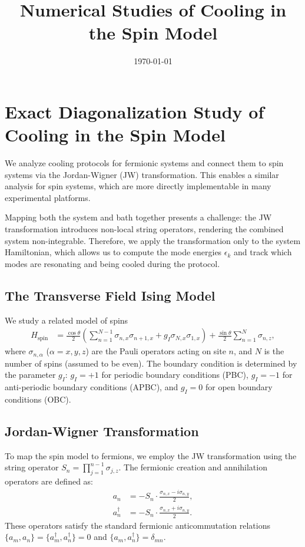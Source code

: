 \documentclass[aps,prx,twocolumn,superscriptaddress,nofootinbib,nolongbibliography,nobalancelastpage,10pt,floatfix]{revtex4-2}
\begin{document}
\title{Numerical Studies of Cooling in the Spin Model}
\date{\today}

\maketitle

\section{Exact Diagonalization Study of Cooling in the Spin Model}

We analyze cooling protocols for fermionic systems and connect them to spin systems via the Jordan-Wigner (JW) transformation. This enables a similar analysis for spin systems, which are more directly implementable in many experimental platforms.

Mapping both the system and bath together presents a challenge: the JW transformation introduces non-local string operators, rendering the combined system non-integrable. Therefore, we apply the transformation only to the system Hamiltonian, which allows us to compute the mode energies $\epsilon_k$ and track which modes are resonating and being cooled during the protocol.

\subsection{The Transverse Field Ising Model}

We study a related model of spins
\begin{align}
    H_{\mathrm{spin}} &= \frac{\cos\theta}{2} \left(\sum_{n=1}^{N-1} \sigma_{n,x}\sigma_{n+1,x} + g_I \sigma_{N,x}\sigma_{1,x}\right) + \frac{\sin\theta}{2} \sum_{n=1}^N \sigma_{n,z}, \label{eq:spin_hamiltonian}
\end{align}
where $\sigma_{n,\alpha}$ ($\alpha = x, y, z$) are the Pauli operators acting on site $n$, and $N$ is the number of spins (assumed to be even). The boundary condition is determined by the parameter $g_I$: $g_I = +1$ for periodic boundary conditions (PBC), $g_I=-1$ for anti-periodic boundary conditions (APBC), and $g_I = 0$ for open boundary conditions (OBC).

\subsection{Jordan-Wigner Transformation}
To map the spin model to fermions, we employ the JW transformation using the string operator $S_n = \prod_{j=1}^{n-1} \sigma_{j,z}$. The fermionic creation and annihilation operators are defined as:
\begin{align}
    a_n      &= -S_n \cdot \frac{\sigma_{n,x} - i\sigma_{n,y}}{2}, \label{eq:JW_a_n}\\
    a_n^\dag &= -S_n \cdot \frac{\sigma_{n,x} + i\sigma_{n,y}}{2}. \label{eq:JW_a_n_dag}
\end{align}
These operators satisfy the standard fermionic anticommutation relations $\{a_m, a_n\} = \{a_m^\dag, a_n^\dag\} = 0$ and $\{a_m, a_n^\dag\} = \delta_{mn}$.
\end{document}
